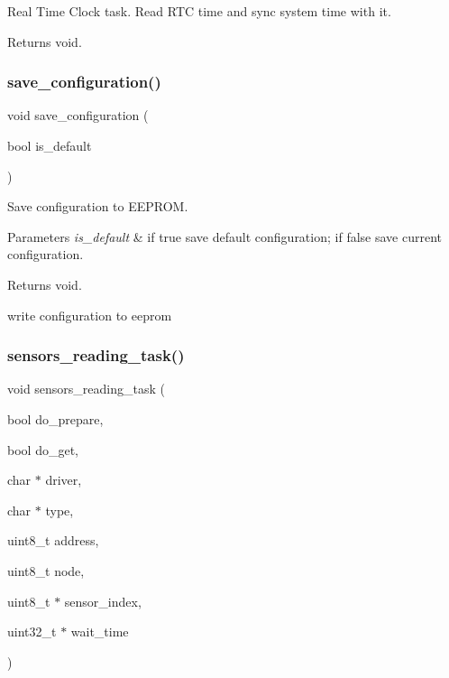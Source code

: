 Real Time Clock task. Read R\+TC time and sync system time with it. 

\begin{DoxyReturn}{Returns}
void. 
\end{DoxyReturn}
\mbox{\label{rmap_8ino_afa979a8cb238fe81bf20654dfd6096ef}} 
\subsubsection{\texorpdfstring{save\+\_\+configuration()}{save\_configuration()}}
{\footnotesize\ttfamily void save\+\_\+configuration (\begin{DoxyParamCaption}\item[{bool}]{is\+\_\+default }\end{DoxyParamCaption})}



Save configuration to E\+E\+P\+R\+OM. 


\begin{DoxyParams}{Parameters}
{\em is\+\_\+default} & if true save default configuration; if false save current configuration. \\
\hline
\end{DoxyParams}
\begin{DoxyReturn}{Returns}
void. 
\end{DoxyReturn}
write configuration to eeprom \mbox{\label{rmap_8ino_a77e801165d14454a2cfb2844c7b9f088}} 
\subsubsection{\texorpdfstring{sensors\+\_\+reading\+\_\+task()}{sensors\_reading\_task()}}
{\footnotesize\ttfamily void sensors\+\_\+reading\+\_\+task (\begin{DoxyParamCaption}\item[{bool}]{do\+\_\+prepare,  }\item[{bool}]{do\+\_\+get,  }\item[{char $\ast$}]{driver,  }\item[{char $\ast$}]{type,  }\item[{uint8\+\_\+t}]{address,  }\item[{uint8\+\_\+t}]{node,  }\item[{uint8\+\_\+t $\ast$}]{sensor\+\_\+index,  }\item[{uint32\+\_\+t $\ast$}]{wait\+\_\+time }\end{DoxyParamCaption})}



